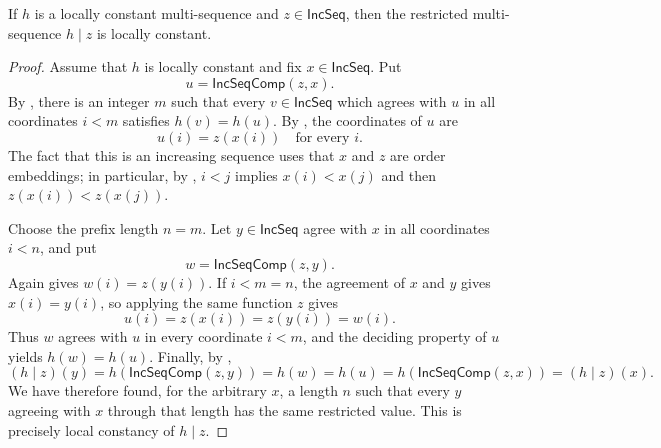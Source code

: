 \begin{lemma}
If $h$ is a locally constant multi-sequence and $z\in\mathsf{IncSeq}$,
then the restricted multi-sequence $h\mathbin{|}z$ is locally constant.
\end{lemma}
\begin{proof}
Assume that $h$ is locally constant and fix $x\in\mathsf{IncSeq}$.  Put
\[
u=\mathsf{IncSeqComp}(z,x).
\]
By , there is an integer $m$ such that every
$v\in\mathsf{IncSeq}$ which agrees with $u$ in all coordinates $i<m$
satisfies $h(v)=h(u)$.  By , the coordinates of $u$ are
\[
u(i)=z(x(i))
\quad\text{for every }i.
\]
The fact that this is an increasing sequence uses that $x$ and $z$ are order
embeddings; in particular, by , $i<j$ implies
$x(i)<x(j)$ and then $z(x(i))<z(x(j))$.

Choose the prefix length $n=m$.  Let $y\in\mathsf{IncSeq}$ agree with $x$ in
all coordinates $i<n$, and put
\[
w=\mathsf{IncSeqComp}(z,y).
\]
Again  gives $w(i)=z(y(i))$.  If $i<m=n$, the agreement
of $x$ and $y$ gives $x(i)=y(i)$, so applying the same function $z$ gives
\[
u(i)=z(x(i))=z(y(i))=w(i).
\]
Thus $w$ agrees with $u$ in every coordinate $i<m$, and the deciding property
of $u$ yields $h(w)=h(u)$.  Finally, by
,
\[
(h\mathbin{|}z)(y)=h(\mathsf{IncSeqComp}(z,y))=h(w)=h(u)
 =h(\mathsf{IncSeqComp}(z,x))=(h\mathbin{|}z)(x).
\]
We have therefore found, for the arbitrary $x$, a length $n$ such that every
$y$ agreeing with $x$ through that length has the same restricted value.
This is precisely local constancy of $h\mathbin{|}z$.
\end{proof}

